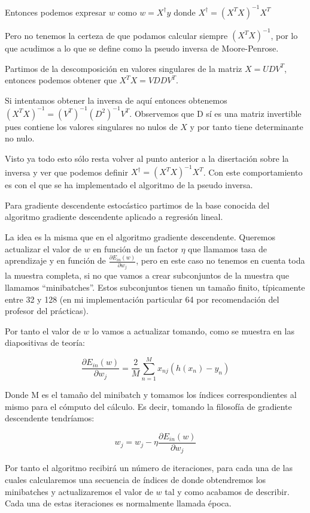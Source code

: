 \documentclass[12pt,a4paper]{article}
\begin{document}
Entonces podemos expresar $w$ como $w = X^{\dagger}y$ donde $X^{\dagger} = (X^T X)^{-1}X^T$

Pero no tenemos la certeza de que podamos calcular siempre $(X^T X)^{-1}$, por lo que acudimos a lo que se define como la pseudo inversa de Moore-Penrose.

Partimos de la descomposición en valores singulares de la matriz $X = UDV^T$, entonces podemos obtener que $X^TX = VDDV^T$.

Si intentamos obtener la inversa de aquí entonces obtenemos $(X^TX)^{-1} = (V^T)^{-1}(D^2)^{-1}V^T$. Observemos que D sí es una matriz invertible pues contiene los valores singulares no nulos de $X$ y por tanto tiene determinante no nulo.

Visto ya todo esto sólo resta volver al punto anterior a la disertación sobre la inversa y ver que podemos definir $X^{\dagger} = (X^T X)^{-1}X^T$. Con este comportamiento es con el que se ha implementado el algoritmo de la pseudo inversa.

Para gradiente descendente estocástico partimos de la base conocida del algoritmo gradiente descendente aplicado a regresión lineal.

La idea es la misma que en el algoritmo gradiente descendente. Queremos actualizar el valor de $w$ en función de un factor $\eta$ que llamamos tasa de aprendizaje y en función de $\frac{\partial E_{in}(w)}{\partial w_j}$, pero en este caso no tenemos en cuenta toda la muestra completa, si no que vamos a crear subconjuntos de la muestra que llamamos ``minibatches''. Estos subconjuntos tienen un tamaño finito, típicamente entre 32 y 128 (en mi implementación particular 64 por recomendación del profesor del prácticas).

Por tanto el valor de $w$ lo vamos a actualizar tomando, como se muestra en las diapositivas de teoría:

$$\frac{\partial E_{in}(w)}{\partial w_j} = \frac{2}{M}\sum_{n=1}^{M}x_{nj}(h(x_n)-y_n)$$

Donde M es el tamaño del minibatch y tomamos los índices correspondientes al mismo para el cómputo del cálculo. Es decir, tomando la filosofía de gradiente descendente tendríamos:

$$w_j = w_j - \eta \frac{\partial E_{in}(w)}{\partial w_j}$$

Por tanto el algoritmo recibirá un número de iteraciones, para cada una de las cuales calcularemos una secuencia de índices de donde obtendremos los minibatches y actualizaremos el valor de $w$ tal y como acabamos de describir. Cada una de estas iteraciones es normalmente llamada época.
\end{document}
